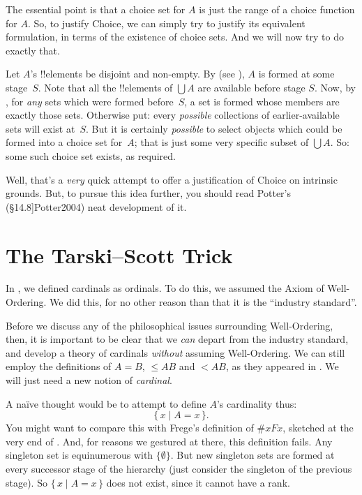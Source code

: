 \documentclass[10pt,a4paper]{article}
\makeatletter
\theoremstyle{plain}
\theoremstyle{definition}
\theoremstyle{remark}
\newcommand*{\olfileid}[3]{}
\newcommand*{\olsection}[1]{\section*{#1}}
\newcommand{\olref}{\@ifnextchar[{\olref@i}{\olref@final}}
\def\olref@i[#1]{\@ifnextchar[{\olref@ii}{\olref@final}}
\def\olref@ii[#1]{\@ifnextchar[{\olref@iii}{\olref@final}}
\def\olref@iii[#1]{\olref@final}
\def\olref@final#1{\ref{#1}}
\providecommand{\cardle}{\leq}
\providecommand{\Setabs}[2]{\{\, #1 \mid #2 \,\}}
\providecommand{\citeyear}[1]{\cite{#1}}
\providecommand{\cardless}{<}
\providecommand{\cardeq}[2]{#1 = #2}
\providecommand{\cardless}{<}
\providecommand{\cardle}{\leq}
\makeatother
\begin{document}
The essential point is that a choice set for $A$ is just the range of
a choice function for $A$. So, to justify Choice, we can simply try to
justify its equivalent formulation, in terms of the existence of
choice sets. And we will now try to do exactly that. 

Let $A$'s !!{element}s be disjoint and non-empty. By \stageshier{}
(see \olref[z][story]{sec}), $A$ is formed at some stage~$S$. Note
that all the !!{element}s of $\bigcup A$ are available before stage
$S$. Now, by \stagesacc{}, for \emph{any} sets which were formed
before~$S$, a set is formed whose members are exactly those sets.
Otherwise put: every \emph{possible} collections of earlier-available
sets will exist at~$S$. But it is certainly \emph{possible} to select
objects which could be formed into a choice set for~$A$; that is just
some very specific subset of $\bigcup A$. So: some such choice set
exists, as required.

Well, that's a \emph{very} quick attempt to offer a justification of
Choice on intrinsic grounds. But, to pursue this idea further, you
should read Potter's (\citeyear[\S14.8]{Potter2004}) neat development
of it.



\olfileid{sth}{choice}{tarskiscott}
\olsection{The Tarski--Scott Trick}

In \olref[cardinals][cardsasords]{defcardinalasordinal}, we
defined cardinals as ordinals. To do this, we assumed the Axiom of
Well-Ordering. We did this, for no other reason than that it is the
``industry standard''.

Before we discuss any of the philosophical issues surrounding
Well-Ordering, then, it is important to be clear that we \emph{can}
depart from the industry standard, and develop a theory of cardinals
\emph{without} assuming Well-Ordering. We can still employ the
definitions of $\cardeq{A}{B}$, $\cardle{A}{B}$ and $\cardless{A}{B}$,
as they appeared in \olref[sfr][siz][]{chap}. We will just need a new
notion of \emph{cardinal}.

A na\"ive thought would be to attempt to define $A$'s cardinality thus:
\[
	\Setabs{x}{\cardeq{A}{x}}.
\]
You might want to compare this with Frege's definition of $\# x Fx$,
sketched at the very end of \olref[cardinals][hp]{sec}. And, for
reasons we gestured at there, this definition fails. Any singleton set
is equinumerous with $\{\emptyset\}$. But new singleton sets are
formed at every successor stage of the hierarchy (just consider the
singleton of the previous stage). So $\Setabs{x}{\cardeq{A}{x}}$ does
not exist, since it cannot have a rank.
\end{document}
